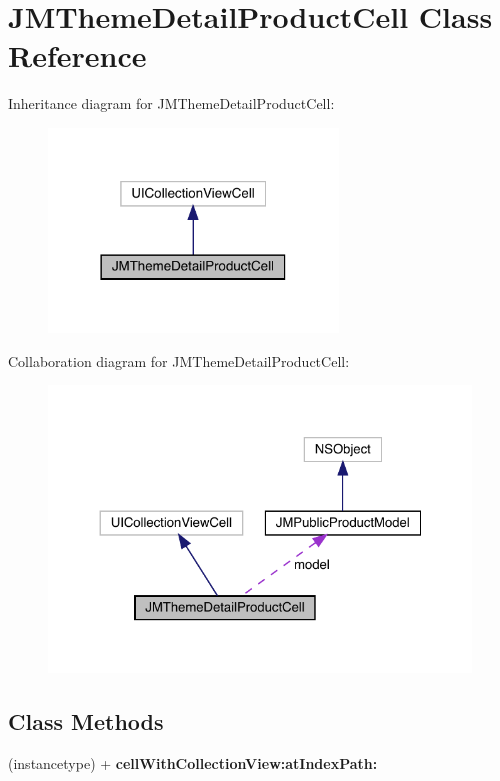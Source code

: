 \hypertarget{interface_j_m_theme_detail_product_cell}{}\section{J\+M\+Theme\+Detail\+Product\+Cell Class Reference}
\label{interface_j_m_theme_detail_product_cell}


Inheritance diagram for J\+M\+Theme\+Detail\+Product\+Cell\+:\nopagebreak
\begin{figure}[H]
\begin{center}
\leavevmode
\includegraphics[width=218pt]{interface_j_m_theme_detail_product_cell__inherit__graph}
\end{center}
\end{figure}


Collaboration diagram for J\+M\+Theme\+Detail\+Product\+Cell\+:\nopagebreak
\begin{figure}[H]
\begin{center}
\leavevmode
\includegraphics[width=324pt]{interface_j_m_theme_detail_product_cell__coll__graph}
\end{center}
\end{figure}
\subsection*{Class Methods}
\begin{DoxyCompactItemize}
\item 
\mbox{\label{interface_j_m_theme_detail_product_cell_a3f58ef7dc8735ed19d44acb9f6bdff56}} 
(instancetype) + {\bfseries cell\+With\+Collection\+View\+:at\+Index\+Path\+:}
\end{DoxyCompactItemize}
